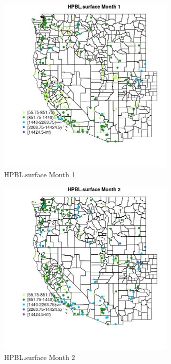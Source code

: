 \begin{figure} 
\centering  
\includegraphics[width=0.77\textwidth]{Code_Outputs/Report_ML_input_PM25_Step4_part_e_de_duplicated_aveswNAs_MapObsMo1HPBLsurface.jpg} 
\caption{\label{fig:Report_ML_input_PM25_Step4_part_e_de_duplicated_aveswNAsMapObsMo1HPBLsurface}HPBL.surface Month 1} 
\end{figure} 
 

\begin{figure} 
\centering  
\includegraphics[width=0.77\textwidth]{Code_Outputs/Report_ML_input_PM25_Step4_part_e_de_duplicated_aveswNAs_MapObsMo2HPBLsurface.jpg} 
\caption{\label{fig:Report_ML_input_PM25_Step4_part_e_de_duplicated_aveswNAsMapObsMo2HPBLsurface}HPBL.surface Month 2} 
\end{figure} 
 

